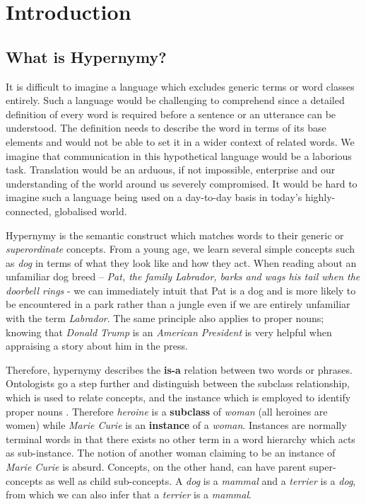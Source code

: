 \chapter{Introduction}

\section{What is Hypernymy?} %
It is difficult to imagine a language which excludes generic terms or word classes entirely.  Such a language would be challenging to comprehend since a detailed definition of every word is required before a sentence or an utterance can be understood.  The definition needs to describe the word in terms of its base elements and would not be able to set it in a wider context of related words.  We imagine that communication in this hypothetical language would be a laborious task.  Translation would be an arduous, if not impossible, enterprise and our understanding of the world around us severely compromised.  It would be hard to imagine such a language being used on a day-to-day basis in today's highly-connected, globalised world.

Hypernymy is the semantic construct which matches words to their generic or \textit{superordinate} concepts.  From a young age, we learn several simple concepts such as \textit{dog} in terms of what they look like and how they act.  When reading about an unfamiliar dog breed – \textit{Pat, the family Labrador, barks and wags his tail when the doorbell rings} - we can immediately intuit that Pat is a dog and is more likely to be encountered in a park rather than a jungle even if we are entirely unfamiliar with the term \textit{Labrador}.  The same principle also applies to proper nouns; knowing that \textit{Donald Trump} is an \textit{American President} is very helpful when appraising a story about him in the press.  

Therefore, hypernymy describes the \textbf{is-a} relation between two words or phrases.  Ontologists go a step further and distinguish between the subclass relationship, which is used to relate concepts, and the instance which is employed to identify proper nouns \citep{miller1990introduction}.  Therefore \textit{heroine} is a \textbf{subclass} of \textit{woman} (all heroines are women) while \textit{Marie Curie} is an \textbf{instance} of a \textit{woman}.  Instances are normally terminal words in that there exists no other term in a word hierarchy which acts as sub-instance.  The notion of another woman claiming to be an instance of \textit{Marie Curie} is absurd.  Concepts, on the other hand, can have parent super-concepts as well as child sub-concepts.  A \textit{dog} is a \textit{mammal} and a \textit{terrier} is a \textit{dog}, from which we can also infer that a \textit{terrier} is a \textit{mammal}.

